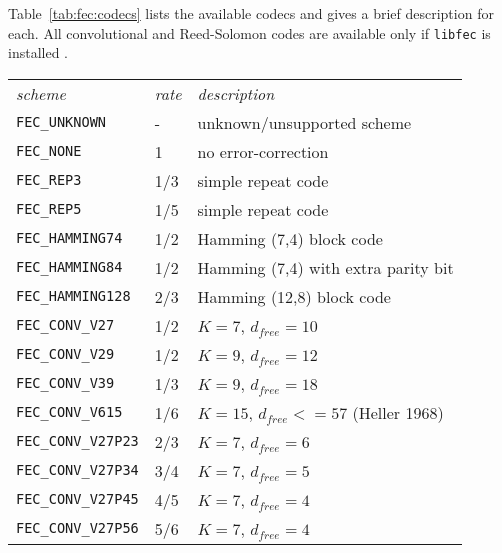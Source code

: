 Table~\ref{tab:fec:codecs} lists the available codecs and gives a brief
description for each.
All convolutional and Reed-Solomon codes are available only if {\tt libfec} is
installed \cite{libfec:web}.

\begin{table*}
\caption{Forward error-correction codecs available in \liquid}
\label{tab:fec:codecs}
\centering
{\small
\begin{tabular*}{0.75\textwidth}{l@{\extracolsep{\fill}}ll}
\toprule
{\it scheme} &
{\it rate} &
{\it description}\\\otoprule
%
{\tt FEC\_UNKNOWN}              & -         & unknown/unsupported scheme\\
{\tt FEC\_NONE}                 & 1         & no error-correction\\
{\tt FEC\_REP3}                 & 1/3       & simple repeat code\\
{\tt FEC\_REP5}                 & 1/5       & simple repeat code\\
{\tt FEC\_HAMMING74}            & 1/2       & Hamming (7,4) block code\\
{\tt FEC\_HAMMING84}            & 1/2       & Hamming (7,4) with extra parity bit\\
{\tt FEC\_HAMMING128}           & 2/3       & Hamming (12,8) block code\\\midrule
%
{\tt FEC\_CONV\_V27}            & 1/2       & $K=7$, $d_{free}=10$\\
{\tt FEC\_CONV\_V29}            & 1/2       & $K=9$, $d_{free}=12$\\
{\tt FEC\_CONV\_V39}            & 1/3       & $K=9$, $d_{free}=18$\\
{\tt FEC\_CONV\_V615}           & 1/6       & $K=15$, $d_{free}<=57$ (Heller 1968)\\\midrule
%
{\tt FEC\_CONV\_V27P23}         & 2/3       & $K=7$, $d_{free}=6$\\
{\tt FEC\_CONV\_V27P34}         & 3/4       & $K=7$, $d_{free}=5$\\
{\tt FEC\_CONV\_V27P45}         & 4/5       & $K=7$, $d_{free}=4$\\
{\tt FEC\_CONV\_V27P56}         & 5/6       & $K=7$, $d_{free}=4$\\

\end{tabular*}}
\end{table*}
